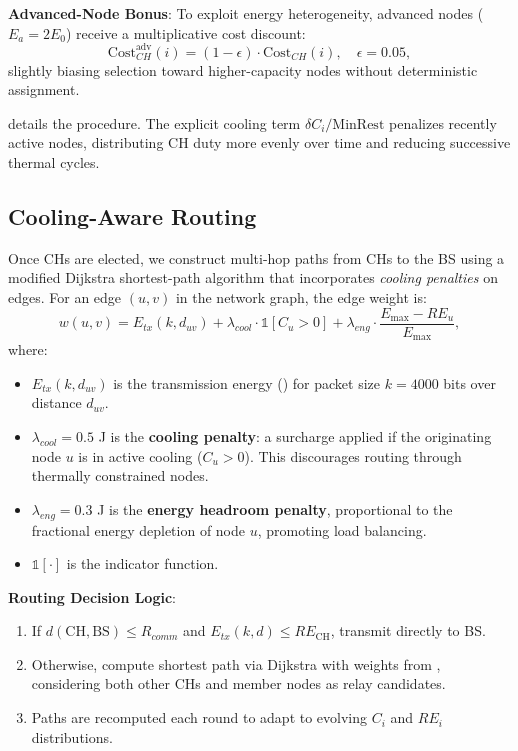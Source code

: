 \textbf{Advanced-Node Bonus}: To exploit energy heterogeneity, advanced nodes ($E_a = 2 E_0$) receive a multiplicative cost discount:
\begin{equation}
\mathrm{Cost}_{CH}^{\text{adv}}(i) = (1 - \epsilon) \cdot \mathrm{Cost}_{CH}(i), \quad \epsilon = 0.05,
\end{equation}
slightly biasing selection toward higher-capacity nodes without deterministic assignment.

 details the procedure. The explicit cooling term $\delta C_i/\text{MinRest}$ penalizes recently active nodes, distributing CH duty more evenly over time and reducing successive thermal cycles.

\subsection{Cooling-Aware Routing}
\label{subsec:routing}

Once CHs are elected, we construct multi-hop paths from CHs to the BS using a modified Dijkstra shortest-path algorithm that incorporates \emph{cooling penalties} on edges. For an edge $(u,v)$ in the network graph, the edge weight is:
\begin{equation}
w(u,v) = E_{tx}(k, d_{uv}) + \lambda_{cool} \cdot \mathbb{1}[C_u > 0] + \lambda_{eng} \cdot \frac{E_{\max} - RE_u}{E_{\max}},
\label{eq:edge-weight}
\end{equation}
where:
\begin{itemize}[noitemsep]
  \item $E_{tx}(k, d_{uv})$ is the transmission energy () for packet size $k=4000$ bits over distance $d_{uv}$.
  \item $\lambda_{cool} = 0.5$ J is the \textbf{cooling penalty}: a surcharge applied if the originating node $u$ is in active cooling ($C_u>0$). This discourages routing through thermally constrained nodes.
  \item $\lambda_{eng} = 0.3$ J is the \textbf{energy headroom penalty}, proportional to the fractional energy depletion of node $u$, promoting load balancing.
  \item $\mathbb{1}[\cdot]$ is the indicator function.
\end{itemize}

\textbf{Routing Decision Logic}:
\begin{enumerate}[label=\arabic*.,noitemsep]
  \item If $d(\text{CH}, \text{BS}) \le R_{comm}$ and $E_{tx}(k, d) \le RE_{\text{CH}}$, transmit directly to BS.
  \item Otherwise, compute shortest path via Dijkstra with weights from , considering both other CHs and member nodes as relay candidates.
  \item Paths are recomputed each round to adapt to evolving $C_i$ and $RE_i$ distributions.
\end{enumerate}

